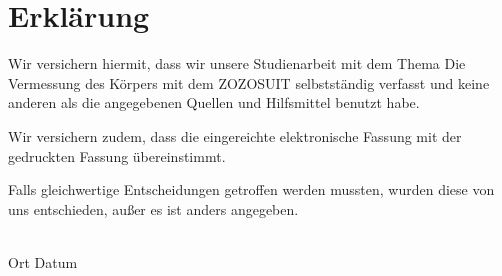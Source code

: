 \chapter*{Erklärung}
\label{ch:erklaerung}

Wir versichern hiermit, dass wir unsere 
Studienarbeit
 mit dem Thema 
\glqq{}Die Vermessung des Körpers mit dem ZOZOSUIT\grqq{}
 selbstständig verfasst und keine anderen als die angegebenen Quellen und Hilfsmittel benutzt habe.

Wir versichern zudem, dass die eingereichte elektronische Fassung mit der gedruckten Fassung übereinstimmt.

Falls gleichwertige Entscheidungen getroffen werden mussten, wurden diese von uns
entschieden, außer es ist anders angegeben.

\vspace{2.0cm}
\underline{\hspace{12cm}}\\
Ort \hspace{3cm} Datum \hspace{2cm} 
\makeatletter
\@author
\makeatother